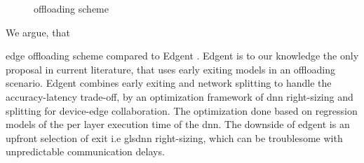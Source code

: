 \begin{figure}
	\captionsetup[subfigure]{justification=centering}
	\centering
\end{figure}
\begin{figure}
		\captionsetup[subfigure]{justification=centering}
	\centering
	\caption[Offloading scheme]{offloading scheme}
	\label{fig:offloading-scheme}
\end{figure} 

We argue, that 

edge offloading scheme compared to Edgent \cite{li_edge_2018}. Edgent is to our knowledge the only proposal in current literature, that uses early exiting models in an offloading scenario. Edgent combines early exiting and network splitting to handle the accuracy-latency trade-off, by an optimization framework of \gls{dnn} right-sizing and splitting for device-edge collaboration. The optimization done based on regression models of the per layer execution time of the \gls{dnn}. The downside of edgent is an upfront selection of exit i.e gls{dnn} right-sizing, which can be troublesome with unpredictable communication delays. 

